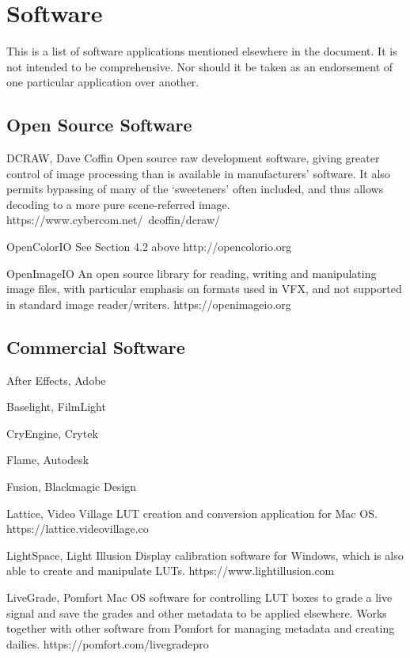 \section{Software}%
\label{sec:software}

This is a list of software applications mentioned elsewhere in the document. It is not intended to be comprehensive. Nor should it be taken as an endorsement of one particular application over another.

\subsection{Open Source Software}%
\label{subsec:open-source-software}

DCRAW, Dave Coffin
Open source raw development software, giving greater control of image processing than is available in manufacturers’ software. It also permits bypassing of many of the ‘sweeteners’ often included, and thus allows decoding to a more pure scene-referred image. https://www.cybercom.net/~dcoffin/dcraw/

OpenColorIO
See Section 4.2 above
http://opencolorio.org

OpenImageIO
An open source library for reading, writing and manipulating image files, with particular emphasis on formats used in VFX, and not supported in standard image reader/writers. https://openimageio.org

\subsection{Commercial Software}%
\label{subsec:commercial-software}
After Effects, Adobe

Baselight, FilmLight

CryEngine, Crytek

Flame, Autodesk

Fusion, Blackmagic Design

Lattice, Video Village
LUT creation and conversion application for Mac OS. https://lattice.videovillage.co

LightSpace, Light Illusion
Display calibration software for Windows, which is also able to create and manipulate LUTs. https://www.lightillusion.com

LiveGrade, Pomfort
Mac OS software for controlling LUT boxes to grade a live signal and save the grades and other metadata to be applied elsewhere. Works together with other software from Pomfort for managing metadata and creating dailies. https://pomfort.com/livegradepro

